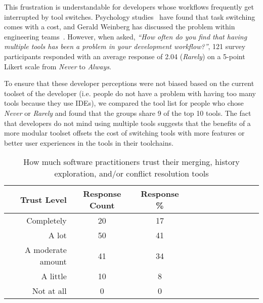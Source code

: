 This frustration is understandable for developers whose workflows frequently get interrupted by tool switches. Psychology studies~\cite{Meiran2000}\cite{gopher2000switching} have found that task switching comes with a cost, and Gerald Weinberg has discussed the problem within engineering teams~\cite{Weinberg1992}. However, when asked, \textit{``How often do you find that having multiple tools has been a problem in your development workflow?''}, 121 survey participants responded with an average response of 2.04 (\textit{Rarely}) on a 5-point Likert scale from \textit{Never} to \textit{Always}. 

To ensure that these developer perceptions were not biased based on the current toolset of the developer (i.e. people do not have a problem with having too many tools because they use IDEs), we compared the tool list for people who chose \textit{Never} or \textit{Rarely} and found that the groups share 9 of the top 10 tools. The fact that developers do not mind using multiple tools suggests that the benefits of a more modular toolset offsets the cost of switching tools with more features or better user experiences in the tools in their toolchains. 

\begin{table}[!]
\renewcommand{\arraystretch}{1.3}
\caption{How much software practitioners trust their merging, history exploration, and/or conflict resolution tools}
\label{survey_tool_trust}
\centering
\begin{tabularx}{0.45\textwidth}{@{}r|*{10}{C}c@{}}
\toprule
Trust Level & Response Count & Response \%\\
\midrule
Completely & 20 & 17\\
A lot & 50 & 41\\
A moderate amount & 41 & 34\\
A little & 10 & 8\\
Not at all & 0 & 0\\
\bottomrule
\end{tabularx}
\end{table}

